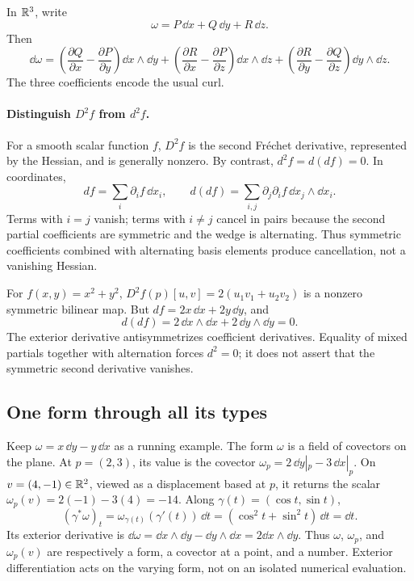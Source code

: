 \begin{example}
In $\mathbb{R}^3$, write
\[
\omega=P\,\dd x+Q\,\dd y+R\,\dd z.
\]
Then
\[
\dd\omega
=
\left(\frac{\partial Q}{\partial x}-\frac{\partial P}{\partial y}\right)
\dd x\wedge\dd y
+
\left(\frac{\partial R}{\partial x}-\frac{\partial P}{\partial z}\right)
\dd x\wedge\dd z
+
\left(\frac{\partial R}{\partial y}-\frac{\partial Q}{\partial z}\right)
\dd y\wedge\dd z.
\]
The three coefficients encode the usual curl.
\end{example}



\paragraph{Distinguish $D^2f$ from $d^2f$.}
For a smooth scalar function $f$, $D^2f$ is the second Fr\'echet derivative,
represented by the Hessian, and is generally nonzero. By contrast,
$d^2f=d(df)=0$. In coordinates,
\[
df=\sum_i\partial_i f\,\dd x_i,\qquad
d(df)=\sum_{i,j}\partial_j\partial_i f\,\dd x_j\wedge\dd x_i.
\]
Terms with $i=j$ vanish; terms with $i\ne j$ cancel in pairs because
the second partial coefficients are symmetric and the wedge is alternating.
Thus symmetric coefficients combined with alternating basis elements
produce cancellation, not a vanishing Hessian.
\begin{example}
For $f(x,y)=x^2+y^2$,
$D^2f(p)[u,v]=2(u_1v_1+u_2v_2)$ is a nonzero symmetric bilinear map.
But $df=2x\,\dd x+2y\,\dd y$, and
\[
d(df)=2\,\dd x\wedge\dd x+2\,\dd y\wedge\dd y=0.
\]
The exterior derivative antisymmetrizes coefficient derivatives.
Equality of mixed partials together with alternation forces $d^2=0$;
it does not assert that the symmetric second derivative vanishes.
\end{example}

\subsection{One form through all its types}
Keep $\omega=x\,\dd y-y\,\dd x$ as a running example.
The form $\omega$ is a field of covectors on the plane. At $p=(2,3)$,
its value is the covector $\omega_p=2\,\dd y|_p-3\,\dd x|_p$.
On $v=(4,-1)\in\mathbb{R}^2$, viewed as a displacement based at $p$, it returns the scalar
$\omega_p(v)=2(-1)-3(4)=-14$.
Along $\gamma(t)=(\cos t,\sin t)$,
\[
(\gamma^*\omega)_t=\omega_{\gamma(t)}(\gamma'(t))\,\dd t
=(\cos^2t+\sin^2t)\,\dd t=\dd t.
\]
Its exterior derivative is
$\dd\omega=\dd x\wedge\dd y-\dd y\wedge\dd x
=2\dd x\wedge\dd y$.
Thus $\omega$, $\omega_p$, and $\omega_p(v)$ are respectively a
form, a covector at a point, and a number. Exterior differentiation acts
on the varying form, not on an isolated numerical evaluation.

